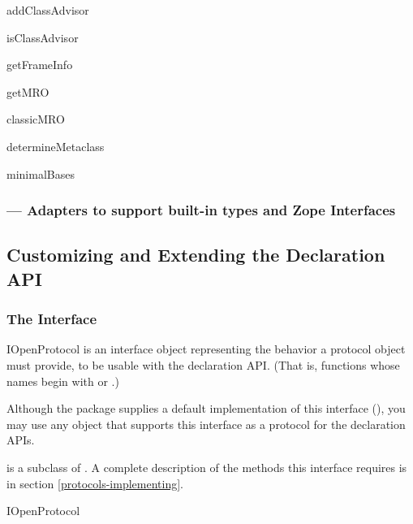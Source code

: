 \begin{verbatim%
}
\begin{verbatim%
}
\begin{verbatim%
}
\begin{verbatim%
}
addClassAdvisor

isClassAdvisor

getFrameInfo

getMRO

classicMRO

determineMetaclass

minimalBases


\subsubsection{ --- Adapters to support built-in types
and Zope Interfaces}






















\subsection{Customizing and Extending the Declaration API\label{customizing-adaptation}}


\subsubsection{The  Interface \label{open-protocols}}

\begin{classdesc*}{IOpenProtocol}
 is an interface object representing the behavior a
protocol object must provide, to be usable with the 
declaration API.  (That is, functions whose names begin with 
or .)

Although the  package supplies a default implementation of
this interface (), you may use any object that
supports this interface as a protocol for the declaration APIs.

 is a subclass of .  A complete
description of the methods this interface requires is in section
\ref{protocols-implementing}.
\end{classdesc*}

IOpenProtocol


\end{verbatim%
}
\end{verbatim%
}
\end{verbatim%
}
\end{verbatim%
}
